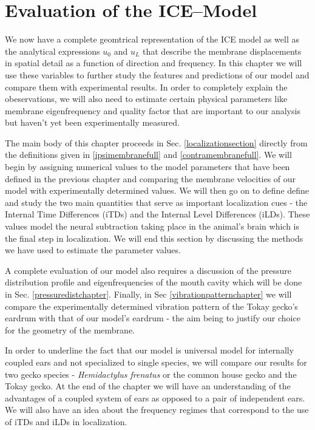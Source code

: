 \chapter{Evaluation of the ICE--Model}\label{modelanalysis}
We now have a complete geomtrical representation of the ICE model as well as
 the analytical expressions $u_0$ and $u_L$ that describe the membrane displacements
in spatial detail as a function of direction and frequency. In this chapter we will use these variables
to further study the features and predictions of our model and compare them with experimental results. In
order to completely explain the obeservations, we will also need to estimate certain physical parameters
like membrane eigenfrequency and quality factor that are important to our analysis but haven't yet been
experimentally measured.

The main body of this chapter proceeds in Sec. \ref{localizationsection} directly from the definitions given in \eqref{ipsimembranefull}
and \eqref{contramembranefull}. We will begin by assigning numerical values to the model parameters that have been defined
in the previous chapter and comparing the membrane velocities of our model with experimentally determined values. 
We will then go on to define define and study the two main quantities that serve as important localization
cues - the Internal Time Differences (iTDs) and the Internal Level Differences (iLDs). These values model the
neural subtraction taking place in the animal's brain which is the final step in localization. We will end this section
by discussing the methods we have used to estimate the parameter values.

A complete evaluation of our model also requires  a discussion of the 
pressure distribution profile and eigenfrequencies of the mouth cavity which will be done in Sec. \ref{pressuredistchapter}.
Finally, in Sec \ref{vibrationpatternchapter} we will compare the experimentally determined vibration pattern
of the Tokay gecko's eardrum with that of our model's eardrum - the aim being to justify our choice for the
geometry of the membrane.

In order to underline the fact that our model is universal model for internally coupled ears and not
specialized to single species, we will compare our results for two gecko species - \textit{Hemidactylus frenatus}
or the common house gecko and the Tokay gecko. At the end of the chapter we will have an understanding of the advantages of a coupled system of ears as opposed
to a pair of independent ears. We will also have an idea about the frequency regimes that correspond to the use
of iTDs and iLDs in localization.


